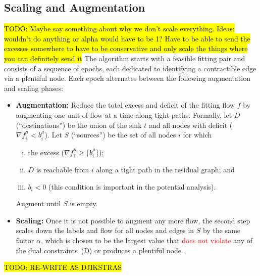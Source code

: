 \documentclass[11pt]{article}
\theoremstyle{definition}
\theoremstyle{definition}
\theoremstyle{definition}
\newcommand{\rewrite}[1]{\textcolor{red}{#1}}
\renewcommand{\todo}[1]{\hl{TODO: #1}}
\begin{document}
    \subsection{Scaling and Augmentation}
    \label{sec:sub-ppn}
		\todo{Maybe say something about why we don't scale everything. Ideas:
		wouldn't do anything or alpha would have to be 1? Have to be able to send
	the excesses somewhere to have to be conservative and only scale the things
where you can definitely send it}
	The algorithm starts with a feasible fitting pair and consists of a sequence
    of epochs, each dedicated to identifying a contractible edge via a plentiful node.
    Each epoch alternates between the following augmentation and scaling phases:
    \begin{itemize}
    \item \textbf{Augmentation:} Reduce the total excess and deficit of the fitting flow $f$
    by augmenting one unit of flow at a time along tight paths. Formally, let
    $D$ (``destinations'') be the union of the sink $t$ and all nodes with 
    deficit ($\nabla f_i^{\mu} < b_i^{\mu}$). Let $S$ (``sources'') be
    the set of all nodes $i$ for which
    \begin{enumerate}[(i)]
    \item the excess ($\nabla f_i^{\mu} \ge \lceil b_i^{\mu} \rceil$);
    \item $D$ is reachable from $i$ along a tight path in the residual graph; and
    \item $b_i < 0$ (this condition is important in the potential analysis).
    \end{enumerate}
    Augment until $S$ is empty.
    \item \textbf{Scaling:} Once it is not possible to augment any more flow, the second step scales down
    the labels and flow for all nodes and edges in $S$ by the same factor $\alpha$,
    which is chosen to be the largest value that \rewrite{does not violate} any of the dual
    constraints~(D) or produces a plentiful node.
    \end{itemize}

    \todo{RE-WRITE AS DJIKSTRAS}
\end{document}
